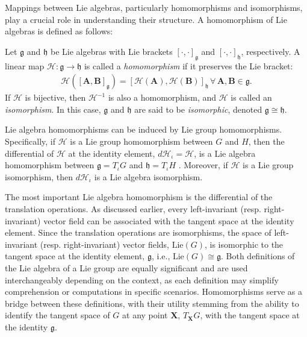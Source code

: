 Mappings between Lie algebras, particularly homomorphisms and isomorphisms, play a crucial role in understanding their structure. A homomorphism of Lie algebras is defined as follows:
\begin{definition}
    Let $\mathfrak{g}$ and $\mathfrak{h}$ be Lie algebras with Lie brackets $[\cdot, \cdot]_\mathfrak{g}$ and $[\cdot, \cdot]_\mathfrak{h}$, respectively. A linear map $\mathscr{H}:\mathfrak{g}\to\mathfrak{h}$ is called a \emph{homomorphism} if it preserves the Lie bracket:
    \begin{align*}
        \mathscr{H}([\mathbf{A}, \mathbf{B}]_\mathfrak{g}) = [\mathscr{H}(\mathbf{A}), \mathscr{H}(\mathbf{B})]_\mathfrak{h}\,\forall\, \mathbf{A},\mathbf{B}\in\mathfrak{g}.
    \end{align*}
    If $\mathscr{H}$ is bijective, then $\mathscr{H}^{-1}$ is also a homomorphism, and $\mathscr{H}$ is called an \emph{isomorphism}. In this case, $\mathfrak{g}$ and $\mathfrak{h}$ are said to be \emph{isomorphic}, denoted $\mathfrak{g}\cong\mathfrak{h}$.
\end{definition}
Lie algebra homomorphisms can be induced by Lie group homomorphisms. Specifically, if $\mathcal{H}$ is a Lie group homomorphism between $G$ and $H$, then the differential of $\mathcal{H}$ at the identity element, $d\mathcal{H}_\iota=\mathscr{H}$, is a Lie algebra homomorphism between $\mathfrak{g}=T_\iota G$ and $\mathfrak{h}=T_\iota H$ \citep[p. 41]{Duistermaat2012}. Moreover, if $\mathcal{H}$ is a Lie group isomorphism, then $d\mathcal{H}_\iota$ is a Lie algebra isomorphism.

The most important Lie algebra homomorphism is the differential of the translation operations. As discussed earlier, every left-invariant (resp. right-invariant) vector field can be associated with the tangent space at the identity element. Since the translation operations are isomorphisms, the space of left-invariant (resp. right-invariant) vector fields, $\text{Lie}(G)$, is isomorphic to the tangent space at the identity element, $\mathfrak{g}$, i.e., $\text{Lie}(G) \cong \mathfrak{g}$. Both definitions of the Lie algebra of a Lie group are equally significant and are used interchangeably depending on the context, as each definition may simplify comprehension or computations in specific scenarios. Homomorphisms serve as a bridge between these definitions, with their utility stemming from the ability to identify the tangent space of $G$ at any point $\mathbf{X}$, $T_\mathbf{X}G$, with the tangent space at the identity $\mathfrak{g}$.

